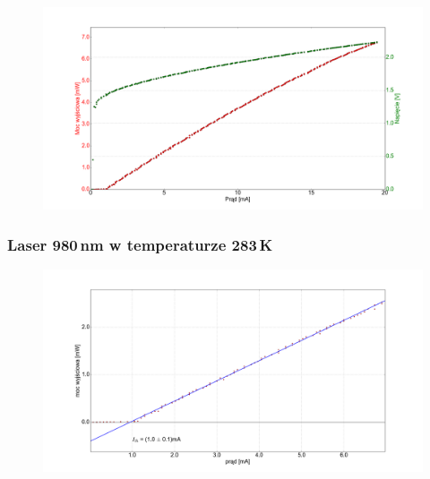 \documentclass[xcolor={dvipsnames,table}]{beamer}
\begin{document}
\begin{frame}
\center
\begin{figure}
   \includegraphics[width=1.10\textwidth,natwidth=69,natheight=87]{temp_10_IVL.png}
\end{figure}

\end{frame}


\begin{frame}
\frametitle{Laser 980\,nm w temperaturze 283\,K}
\center
\begin{figure}
   \includegraphics[width=1.10\textwidth,natwidth=69,natheight=87]{temp_10_fit.png}
\end{figure}
\end{frame}
\end{document}
